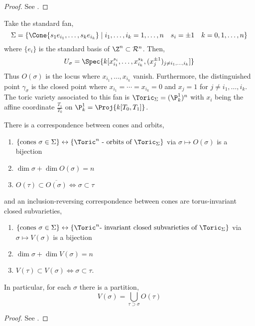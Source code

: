 \begin{proof}
See \cite[Lec. 2]{cox_lectures}.
\end{proof}

\begin{example}
Take the standard fan,
\[ \Sigma = \{ \Cone{s_{1} e_{i_1}, \dots, s_k e_{i_k}} \mid i_1, \dots, i_k = 1, \dots, n \quad s_i = \pm 1 \quad k = 0,1,\dots, n \} \] where $\{ e_i \}$ is the standard basis of $\Z^n \subset \R^n$. Then,
\[ U_\sigma = \Spec{k[x_{i_1}^{s_i}, \dots, x_{i_k}^{s_k}, (x^{\pm 1}_{j})_{j \neq i_1, \dots, i_k}]} \]
Thus $O(\sigma)$ is the locus where $x_{i_1}, \dots, x_{i_k}$ vanish.
Furthermore, the distinguished point $\gamma_\sigma$ is the closed point where $x_{i_1} = \cdots = x_{i_k} = 0$ and $x_j = 1$ for $j \neq i_1, \dots, i_k$. The toric variety associated to this fan is $\Toric_{\Sigma} = (\P^1_k)^n$ with $x_i$ being the affine coordinate $\frac{T_1}{T_0}$ on $\P^1_k = \Proj{k[T_0, T_1]}$.
\end{example}

\begin{theorem}
There is a correspondence between cones and orbits,
\begin{enumerate}
\item $\{ \text{cones } \sigma \in \Sigma \} \leftrightarrow \{ \Toric^n \text{ - orbits of } \Toric_\Sigma \}$ via $\sigma \mapsto O(\sigma)$ is a bijection
\item $\dim{\sigma} + \dim{O(\sigma)} = n$
\item $O(\tau) \subset \overline{O(\sigma)} \iff \sigma \subset \tau$
\end{enumerate}
and an inclusion-reversing correspondence between cones are torus-invariant closed subvarieties,
\begin{enumerate}
\item $\{ \text{cones } \sigma \in \Sigma \} \leftrightarrow \{ \Toric^n \text{- invariant closed subvarieties of } \Toric_\Sigma \}$ via $\sigma \mapsto V(\sigma)$ is a bijection
\item $\dim{\sigma} + \dim{V(\sigma)} = n$
\item $V(\tau) \subset V(\sigma) \iff \sigma \subset \tau$.
\end{enumerate}
In particular, for each $\sigma$ there is a partition,
\[ V(\sigma) = \bigcup_{\tau \supset \sigma} O(\tau) \]
\end{theorem}

\begin{proof}
See \cite[Lec. 2]{cox_lectures}.
\end{proof}

